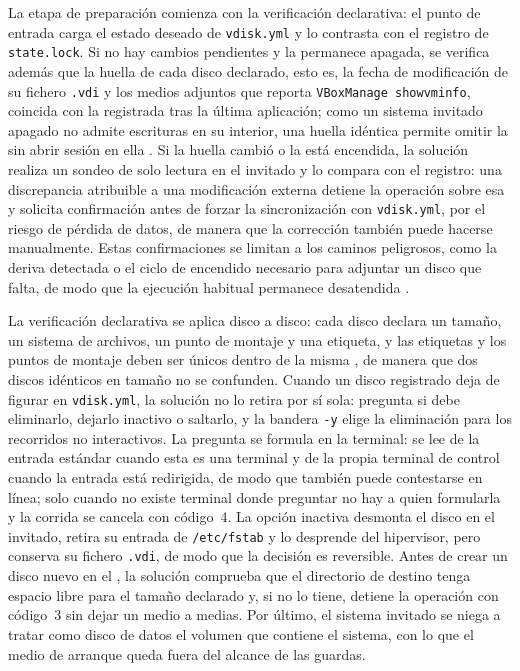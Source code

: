 La etapa de preparación comienza con la verificación declarativa: el punto de entrada carga el estado deseado de \texttt{vdisk.yml} y lo contrasta con el registro de \texttt{state.lock}. Si no hay cambios pendientes y la \vm{} permanece apagada, se verifica además que la huella de cada disco declarado, esto es, la fecha de modificación de su fichero \texttt{.vdi} y los medios adjuntos que reporta \texttt{VBoxManage showvminfo}, coincida con la registrada tras la última aplicación; como un sistema invitado apagado no admite escrituras en su interior, una huella idéntica permite omitir la \vm{} sin abrir sesión en ella \parencite{idempotency_concept}. Si la huella cambió o la \vm{} está encendida, la solución realiza un sondeo de solo lectura en el invitado y lo compara con el registro: una discrepancia atribuible a una modificación externa detiene la operación sobre esa \vm{} y solicita confirmación antes de forzar la sincronización con \texttt{vdisk.yml}, por el riesgo de pérdida de datos, de manera que la corrección también puede hacerse manualmente. Estas confirmaciones se limitan a los caminos peligrosos, como la deriva detectada o el ciclo de encendido necesario para adjuntar un disco que falta, de modo que la ejecución habitual permanece desatendida \parencite{virtualbox_vboxmanage}.

La verificación declarativa se aplica disco a disco: cada disco declara un tamaño, un sistema de archivos, un punto de montaje y una etiqueta, y las etiquetas y los puntos de montaje deben ser únicos dentro de la misma \vm{}, de manera que dos discos idénticos en tamaño no se confunden. Cuando un disco registrado deja de figurar en \texttt{vdisk.yml}, la solución no lo retira por sí sola: pregunta si debe eliminarlo, dejarlo inactivo o saltarlo, y la bandera \texttt{-y} elige la eliminación para los recorridos no interactivos. La pregunta se formula en la terminal: se lee de la entrada estándar cuando esta es una terminal y de la propia terminal de control cuando la entrada está redirigida, de modo que también puede contestarse en línea; solo cuando no existe terminal donde preguntar no hay a quien formularla y la corrida se cancela con código~4. La opción inactiva desmonta el disco en el invitado, retira su entrada de \texttt{/etc/fstab} y lo desprende del hipervisor, pero conserva su fichero \texttt{.vdi}, de modo que la decisión es reversible. Antes de crear un disco nuevo en el \host{}, la solución comprueba que el directorio de destino tenga espacio libre para el tamaño declarado y, si no lo tiene, detiene la operación con código~3 sin dejar un medio a medias. Por último, el sistema invitado se niega a tratar como disco de datos el volumen que contiene el sistema, con lo que el medio de arranque queda fuera del alcance de las guardas.

